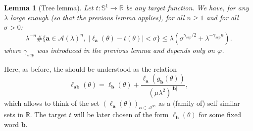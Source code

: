 \documentclass[11pt]{amsart}
\theoremstyle{plain}
\newtheorem{lemma}[theorem]{Lemma}
\theoremstyle{definition}
\numberwithin{equation}{section}
\begin{document}
\begin{lemma}[Tree lemma]
Let $t:\mathbb{S}^1 \rightarrow \mathbb{R}$ be any target function.
We have, for any $\lambda$ large enough (so that the previous lemma applies), for all $n \geq 1$ and for all $\sigma>0$:
$$ \lambda^{-n} \#\{ \mathbf{a} \in \mathcal{A}(\lambda)^n, \ |\ell_\mathbf{a}(\theta) - t(\theta)|<\sigma \} \leq \lambda (\sigma^{\gamma_{sep}/2}+\lambda^{-\gamma_{sep} n}). $$
where $\gamma_{sep}$ was introduced in the previous lemma and depends only on $\varphi$.
\end{lemma}

Here, as before, the  should be understood as the  relation 
$$\ell_{\mathbf{ab}}(\theta) = \ell_\mathbf{b}(\theta)+ \frac{\ell_\mathbf{a}(g_\mathbf{b}(\theta))}{(\mu \lambda^2)^{|\mathbf{b}|}},$$ which allows to think of the set $(\ell_{\mathbf{a}}(\theta))_{\mathbf{a} \in \mathcal{A}^\infty}$ as a (family of) self similar sets in $\mathbb{R}$. The target $t$ will be later chosen of the form $\ell_\mathbf{b}(\theta)$ for some fixed word $\mathbf{b}$.
\end{document}
